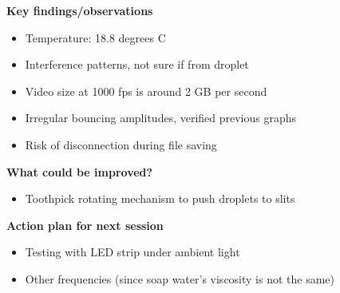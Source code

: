 \textbf{Key findings/observations}

\begin{itemize}
\item Temperature: 18.8 degrees C
\item Interference patterns, not sure if from droplet
\item Video size at 1000 fps is around 2 GB per second
\item Irregular bouncing amplitudes, verified previous graphs
\item Risk of disconnection during file saving
\end{itemize}
\bigskip

\textbf{What could be improved?}

\begin{itemize}
\item Toothpick rotating mechanism to push droplets to slits
\end{itemize}

\bigskip

\textbf{Action plan for next session}

\begin{itemize}
\item Testing with LED strip under ambient light
\item Other frequencies (since soap water's viscosity is not the same)
\end{itemize}
